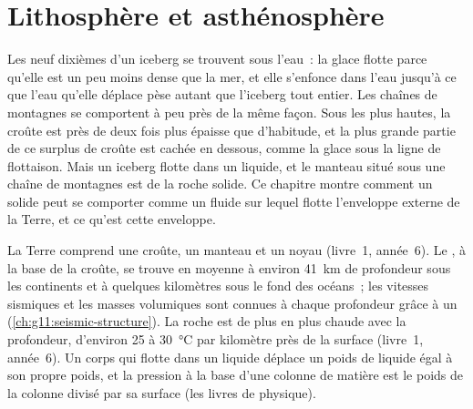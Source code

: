 \chapter{Lithosphère et asthénosphère}\label{ch:g11:lithosphere-asthenosphere}

Les neuf dixièmes d'un iceberg se trouvent sous l'eau~: la glace flotte
parce qu'elle est un peu moins dense que la mer, et elle s'enfonce dans
l'eau jusqu'à ce que l'eau qu'elle déplace pèse autant que l'iceberg tout
entier. Les chaînes de montagnes se comportent à peu près de la même façon.
Sous les plus hautes, la croûte est près de deux fois plus épaisse que
d'habitude, et la plus grande partie de ce surplus de croûte est cachée
en dessous, comme la glace sous la ligne de flottaison. Mais un iceberg
flotte dans un liquide, et le manteau situé sous une chaîne de montagnes est
de la roche solide. Ce chapitre montre comment un solide peut se comporter
comme un fluide sur lequel flotte l'enveloppe externe de la Terre, et ce
qu'est cette enveloppe.

\begin{recall}
La Terre comprend une croûte, un manteau et un noyau (livre~1, année~6). Le
, à la base de la croûte, se trouve en moyenne à environ \qty{41}{km} de
profondeur sous les continents et à quelques kilomètres sous le fond des
océans~; les vitesses sismiques et les masses volumiques sont connues à
chaque profondeur grâce à un 
(\cref{ch:g11:seismic-structure}). La roche est de plus en plus chaude avec
la profondeur, d'environ 25 à \qty{30}{\celsius} par kilomètre près de la
surface (livre~1, année~6). Un corps qui flotte dans un liquide déplace un
poids de liquide égal à son propre poids, et la pression à la base d'une
colonne de matière est le poids de la colonne divisé par sa surface (les
livres de physique).
\end{recall}

